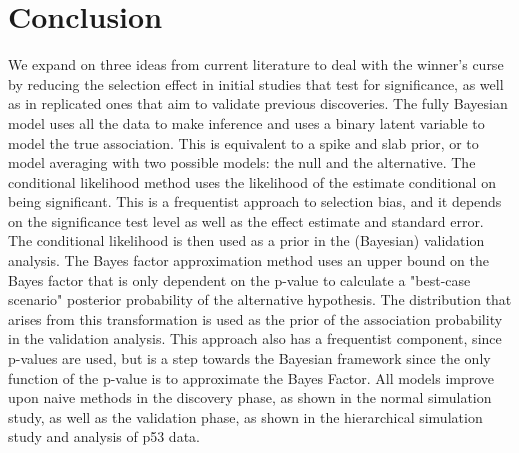 \documentclass[AMA,STIX1COL]{WileyNJD-v2}\usepackage[]{graphicx}\usepackage[]{color}
\begin{document}
\begin{table}

\caption{\label{tab:unnamed-chunk-33}rs8073498n}
\centering
{}
\end{table}


\section{Conclusion}\label{sec:conclusion}


We expand on three ideas from current literature to deal with the winner's curse by reducing the selection effect in initial studies that test for significance, as well as in replicated ones that aim to validate previous discoveries. The fully Bayesian model uses all the data to make inference and uses a binary latent variable to model the true association. This is equivalent to a spike and slab prior, or to model averaging with two possible models: the null and the alternative.  The conditional likelihood method uses the likelihood of the estimate conditional on being significant. This is a frequentist approach to selection bias, and it depends on the significance test level as well as the effect estimate and standard error. The conditional likelihood is then used as a prior in the (Bayesian) validation analysis. The Bayes factor approximation method uses an upper bound on the Bayes factor that is only dependent on the p-value to calculate a "best-case scenario" posterior probability of the alternative hypothesis. The distribution that arises from this transformation is used as the prior of the association probability in the validation analysis. This approach also has a frequentist component, since p-values are used, but is a step towards the Bayesian framework since the only function of the p-value is to approximate the Bayes Factor. All models improve upon naive methods in the discovery phase, as shown in the normal simulation study, as well as the validation phase, as shown in the hierarchical simulation study and analysis of p53 data.
\end{document}
